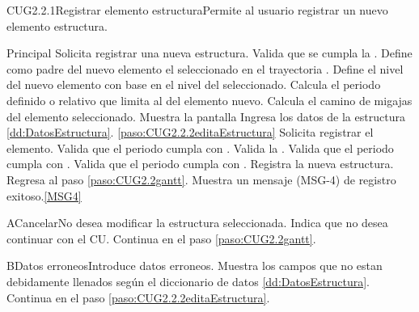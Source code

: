 	\begin{UseCase}{CUG2.2.1}{Registrar elemento estructura}{Permite al usuario registrar un nuevo elemento estructura.}
	\end{UseCase}

	\begin{UCtrayectoria}{Principal}
		\UCpaso[\UCactor] Solicita registrar una nueva estructura.
		\UCpaso Valida que se cumpla la   .
		\UCpaso Define como padre del nuevo elemento el seleccionado en el  trayectoria . 
		\UCpaso Define el nivel del nuevo elemento con base en el nivel del seleccionado.
		\UCpaso Calcula el periodo definido o relativo que limita al del elemento nuevo.
		\UCpaso Calcula el camino de migajas del elemento seleccionado.
		\UCpaso Muestra la pantalla 
		\UCpaso [\UCactor] Ingresa los datos de la estructura \ref{dd:DatosEstructura}. \ref{paso:CUG2.2.2editaEstructura}
		\UCpaso [\UCactor] Solicita registrar el elemento.  
		\UCpaso Valida que el periodo cumpla con   .
		\UCpaso Valida la   .
		\UCpaso Valida que el periodo cumpla con   .
		\UCpaso Valida que el periodo cumpla con   .
		\UCpaso Registra la nueva estructura.
		\UCpaso Regresa al paso \ref{paso:CUG2.2gantt}.
		\UCpaso Muestra un mensaje (MSG-4) de registro exitoso.\ref{MSG4}
	\end{UCtrayectoria}

	\begin{UCtrayectoriaA}{A}{Cancelar}{No desea modificar la estructura seleccionada.}
		\UCpaso[\UCactor] Indica que no desea continuar con el CU.
		\UCpaso Continua en el paso \ref{paso:CUG2.2gantt}.
	\end{UCtrayectoriaA}

	\begin{UCtrayectoriaA}{B}{Datos erroneos}{Introduce datos erroneos.}
		\UCpaso Muestra los campos que no estan debidamente llenados según el diccionario de datos \ref{dd:DatosEstructura}.
		\UCpaso Continua en el paso \ref{paso:CUG2.2.2editaEstructura}.
	\end{UCtrayectoriaA}

